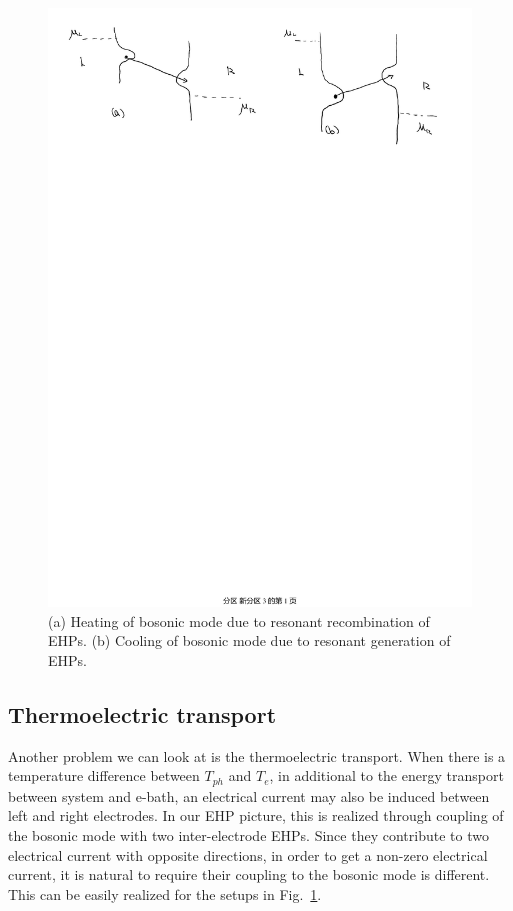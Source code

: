 \documentclass[aps
,floatfix,footinbib,
preprint
]{revtex4-1}
\begin{document}
\begin{figure}[h]
	\includegraphics[scale=0.45,angle=0]{heating-cooling.pdf}
	\caption{(a) Heating of bosonic mode due to resonant recombination of EHPs. (b) Cooling of bosonic mode due to resonant generation of EHPs.}
	\label{fig:resonant}
\end{figure}


\subsection{Thermoelectric transport}
Another problem we can look at is the thermoelectric transport. When there is a temperature difference between $T_{ph}$ and $T_e$, in additional to the energy transport between system and e-bath, an electrical current may also be induced between left and right electrodes\cite{}. In our EHP picture, this is realized through coupling of the bosonic mode with two inter-electrode EHPs. Since they contribute to two electrical current with opposite directions, in order to get a non-zero electrical current, it is natural to require their coupling to the bosonic mode is different. This can be easily realized for the setups in Fig.~\ref{fig:resonant}.
\end{document}
